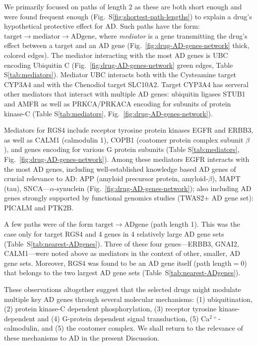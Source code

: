 \documentclass[letterpaper]{article}
\begin{document}
We primarily focused on paths of length 2 as these are both short enough and
were found frequent enough (Fig.~S\ref{fig:shortest-path-lengths}) to explain
a drug's hypothetical protective effect for AD.  Such paths have the form:
$\mathrm{target} \rightarrow \mathrm{mediator} \rightarrow \mathrm{AD gene}$,
where \emph{mediator} is a gene transmitting the drug's effect between a target
and an AD gene (Fig.~\ref{fig:drug-AD-genes-network} thick, colored edges).
The mediator interacting with the most AD genes is UBC encoding Ubiquitin C
(Fig.~\ref{fig:drug-AD-genes-network} green edges, Table
S\ref{tab:mediators}). Mediator UBC interacts both with the Cysteamine target
CYP3A4 and with the Chenodiol target SLC10A2.  Target CYP3A4 has serveral
other mediators that interact with multiple AD genes: ubiquitin ligases STUB1
and AMFR as well as PRKCA/PRKACA encoding for subunits of protein kinase-C
(Table S\ref{tab:mediators}, Fig.~\ref{fig:drug-AD-genes-network}).

Mediators for RGS4 include receptor tyrosine protein kinases EGFR and ERBB3,
as well as CALM1 (calmodulin 1), COPB1 (coatomer protein complex subunit
$\beta$), and genes encoding for various G protein subunits (Table
S\ref{tab:mediators}, Fig.~\ref{fig:drug-AD-genes-network}).  Among these
mediators EGFR interacts with the most AD genes, including well-established
knowledge based AD genes of crucial relevance to AD: APP (amyloid precursor
protein, amyloid-$\beta$), MAPT (tau), SNCA---$\alpha$-synuclein
(Fig.~\ref{fig:drug-AD-genes-network}); also including AD genes strongly
supported by functional genomics studies (TWAS2+ AD gene set): PICALM and
PTK2B.

A few paths were of the form $\mathrm{target} \rightarrow \mathrm{AD gene}$
(path length 1).  This was the case only for target RGS4 and 4 genes in 4
relatively large AD gene sets (Table~S\ref{tab:nearest-ADgenes}).  Three of
these four genes---ERBB3, GNAI2, CALM1---were noted above as mediators in the
context of other, smaller, AD gene sets.  Moreover, RGS4 was found to be an AD
gene itself (path length$=0$) that belongs to the two largest AD gene sets
(Table~S\ref{tab:nearest-ADgenes}).

These observations altogether suggest that the selected drugs might modulate
multiple key AD genes through several molecular mechanisms: (1)
ubiquitination, (2) protein kinase-C dependent phosphorylation, (3) receptor
tyrosine kinase-dependent and (4) G-protein dependent signal transduction, (5)
Ca$^{2+}$-calmodulin, and (5) the coatomer complex.  We shall return to the
relevance of these mechanisms to AD in the present Discussion.
\end{document}

